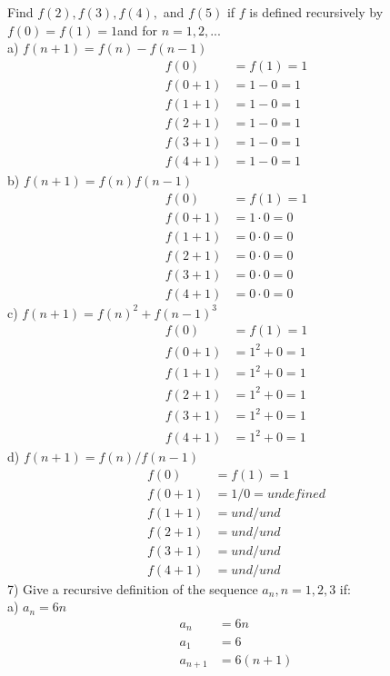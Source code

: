 \documentclass{article}
\begin{document}
\begin{flushleft}
\setlength\parindent{0pt}Find $f(2), f(3), f(4),$ and $f(5)$ if $f$ is defined recursively by $f(0) = f(1) =1 $and for $n = 1,2,...$ \\
\setlength\parindent{24pt}a) $f(n+1) = f(n) - f(n-1)$
\begin{align*}
f(0) &= f(1) = 1 \\
f(0 + 1) &= 1 - 0 = 1 \\
f(1 + 1) &= 1 - 0 = 1 \\
f(2 + 1) &= 1 - 0 = 1 \\
f(3 + 1) &= 1 - 0 = 1 \\
f(4 + 1) &= 1 - 0 = 1
\end{align*}
\setlength\parindent{24pt}b) $f(n+1) = f(n)f(n-1)$ 
\begin{align*}
f(0) &= f(1) = 1 \\
f(0 + 1) &= 1\cdot 0 = 0 \\
f(1 + 1) &= 0\cdot 0 = 0 \\ 
f(2 + 1) &= 0\cdot 0 = 0 \\ 
f(3 + 1) &= 0\cdot 0 = 0 \\
f(4 + 1) &= 0\cdot 0 = 0
\end{align*}
\setlength\parindent{24pt}c) $f(n+1) = f(n)^2 + f(n-1)^3$ 
\begin{align*}
f(0) &= f(1) = 1 \\
f(0 + 1) &= 1^2 + 0 = 1 \\
f(1 + 1) &= 1^2 + 0 = 1 \\
f(2 + 1) &= 1^2 + 0 = 1 \\
f(3 + 1) &= 1^2 + 0 = 1 \\
f(4 + 1) &= 1^2 + 0 = 1
\end{align*}
\setlength\parindent{24pt}d) $f(n+1) = f(n) / f(n-1)$ 
\begin{align*}
f(0) &= f(1) = 1 \\
f(0 +1 ) &= 1 / 0 = undefined \\
f(1 + 1) &= und / und \\
f(2 + 1) &= und / und \\
f(3 + 1) &= und / und \\
f(4 + 1) &= und / und 
\end{align*}
\setlength\parindent{0pt}7) Give a recursive definition of the sequence ${a_n}, n = 1,2,3 $ if: \\
\setlength\parindent{24pt}a) $a_n = 6n$
\begin{align*}
a_n &= 6n \\
a_1 &= 6 \\
a_{n+1} &= 6(n+1) \\

\end{align*}
\end{flushleft}
\end{document}
